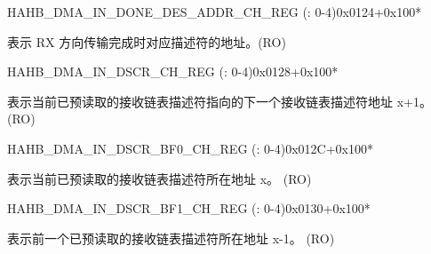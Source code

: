 \begin{register}{H}{AHB\_DMA\_IN\_DONE\_DES\_ADDR\_CH\_REG (: 0-4)}{0x0124+0x100*}\label{regdesc:AHBDMAINDONEDESADDRCHNREG}
%
\regnewline%
\begin{regdesc}\begin{reglist}
\label{fielddesc:AHBDMAINDONEDESADDRCHN}\item [AHB\_DMA\_IN\_DONE\_DES\_ADDR\_CH\regindex{n}] 表示 RX 方向传输完成时对应描述符的地址。(RO)
\end{reglist}\end{regdesc}
\end{register}


\begin{register}{H}{AHB\_DMA\_IN\_DSCR\_CH\_REG (: 0-4)}{0x0128+0x100*}\label{regdesc:AHBDMAINDSCRCHNREG}
%
\regnewline%
\begin{regdesc}\begin{reglist}
\label{fielddesc:AHBDMAINLINKDSCRCHN}\item [AHB\_DMA\_INLINK\_DSCR\_CH\regindex{n}] 表示当前已预读取的接收链表描述符指向的下一个接收链表描述符地址 x+1。 (RO)
\end{reglist}\end{regdesc}
\end{register}


\begin{register}{H}{AHB\_DMA\_IN\_DSCR\_BF0\_CH\_REG (: 0-4)}{0x012C+0x100*}\label{regdesc:AHBDMAINDSCRBF0CHNREG}
%
\regnewline%
\begin{regdesc}\begin{reglist}
\label{fielddesc:AHBDMAINLINKDSCRBF0CHN}\item [AHB\_DMA\_INLINK\_DSCR\_BF0\_CH\regindex{n}] 表示当前已预读取的接收链表描述符所在地址 x。 (RO)
\end{reglist}\end{regdesc}
\end{register}


\begin{register}{H}{AHB\_DMA\_IN\_DSCR\_BF1\_CH\_REG (: 0-4)}{0x0130+0x100*}\label{regdesc:AHBDMAINDSCRBF1CHNREG}
%
\regnewline%
\begin{regdesc}\begin{reglist}
\label{fielddesc:AHBDMAINLINKDSCRBF1CHN}\item [AHB\_DMA\_INLINK\_DSCR\_BF1\_CH\regindex{n}] 表示前一个已预读取的接收链表描述符所在地址 x-1。 (RO)
\end{reglist}\end{regdesc}
\end{register}


